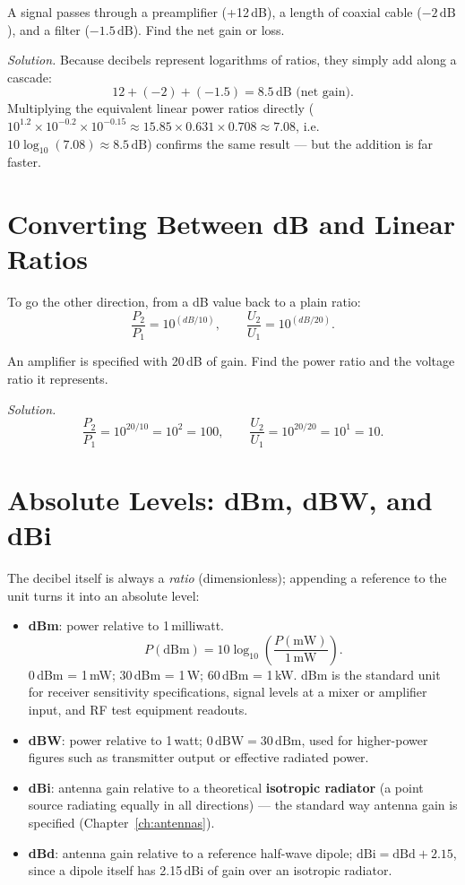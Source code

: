 \begin{examplebox}
A signal passes through a preamplifier (+12\,dB), a length of coaxial
cable ($-2\,\text{dB}$), and a filter ($-1.5\,\text{dB}$). Find the net
gain or loss.

\emph{Solution.} Because decibels represent logarithms of ratios, they
simply add along a cascade:
\[
12 + (-2) + (-1.5) = 8.5\,\text{dB (net gain)}.
\]
Multiplying the equivalent linear power ratios directly
($10^{1.2}\times10^{-0.2}\times10^{-0.15} \approx 15.85\times0.631\times0.708
\approx 7.08$, i.e.\ $10\log_{10}(7.08)\approx8.5\,\text{dB}$) confirms
the same result --- but the addition is far faster.
\end{examplebox}

\section{Converting Between dB and Linear Ratios}

To go the other direction, from a dB value back to a plain ratio:
\[
\frac{P_2}{P_1} = 10^{(dB/10)}, \qquad \frac{U_2}{U_1} = 10^{(dB/20)}.
\]

\begin{examplebox}[dB to linear]
An amplifier is specified with 20\,dB of gain. Find the power ratio and
the voltage ratio it represents.

\emph{Solution.}
\[
\frac{P_2}{P_1} = 10^{20/10} = 10^2 = 100, \qquad
\frac{U_2}{U_1} = 10^{20/20} = 10^1 = 10.
\]
\end{examplebox}

\section{Absolute Levels: dBm, dBW, and dBi}

The decibel itself is always a \emph{ratio} (dimensionless); appending a
reference to the unit turns it into an absolute level:

\begin{itemize}
\item \textbf{dBm}: power relative to 1\,milliwatt.
\[
P(\text{dBm}) = 10\log_{10}\!\left(\frac{P(\text{mW})}{1\,\text{mW}}\right).
\]
0\,dBm = 1\,mW; 30\,dBm = 1\,W; 60\,dBm = 1\,kW. dBm is the standard unit
for receiver sensitivity specifications, signal levels at a mixer or
amplifier input, and RF test equipment readouts.
\item \textbf{dBW}: power relative to 1\,watt; $0\,\text{dBW} =
30\,\text{dBm}$, used for higher-power figures such as transmitter
output or effective radiated power.
\item \textbf{dBi}: antenna gain relative to a theoretical
\textbf{isotropic radiator} (a point source radiating equally in all
directions) --- the standard way antenna gain is specified
(Chapter~\ref{ch:antennas}).
\item \textbf{dBd}: antenna gain relative to a reference half-wave
dipole; $\text{dBi} = \text{dBd} + 2.15$, since a dipole itself has
2.15\,dBi of gain over an isotropic radiator.
\end{itemize}

